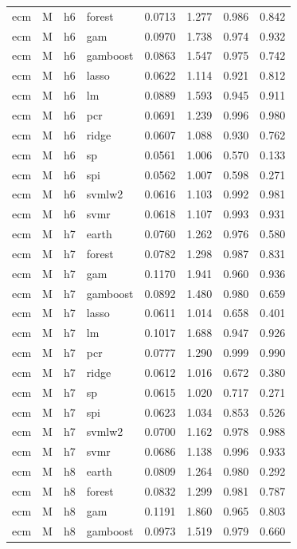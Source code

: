 \begin{ThreePartTable}
\begin{longtable}[t]{llclcccc}
ecm & M & h6 & forest & 0.0713 & 1.277 & 0.986 & 0.842\\
ecm & M & h6 & gam & 0.0970 & 1.738 & 0.974 & 0.932\\
ecm & M & h6 & gamboost & 0.0863 & 1.547 & 0.975 & 0.742\\
ecm & M & h6 & lasso & 0.0622 & 1.114 & 0.921 & 0.812\\
ecm & M & h6 & lm & 0.0889 & 1.593 & 0.945 & 0.911\\
ecm & M & h6 & pcr & 0.0691 & 1.239 & 0.996 & 0.980\\
ecm & M & h6 & ridge & 0.0607 & 1.088 & 0.930 & 0.762\\
ecm & M & h6 & sp & 0.0561 & 1.006 & 0.570 & 0.133\\
ecm & M & h6 & spi & 0.0562 & 1.007 & 0.598 & 0.271\\
ecm & M & h6 & svmlw2 & 0.0616 & 1.103 & 0.992 & 0.981\\
ecm & M & h6 & svmr & 0.0618 & 1.107 & 0.993 & 0.931\\
\addlinespace
ecm & M & h7 & earth & 0.0760 & 1.262 & 0.976 & 0.580\\
ecm & M & h7 & forest & 0.0782 & 1.298 & 0.987 & 0.831\\
ecm & M & h7 & gam & 0.1170 & 1.941 & 0.960 & 0.936\\
ecm & M & h7 & gamboost & 0.0892 & 1.480 & 0.980 & 0.659\\
ecm & M & h7 & lasso & 0.0611 & 1.014 & 0.658 & 0.401\\
ecm & M & h7 & lm & 0.1017 & 1.688 & 0.947 & 0.926\\
ecm & M & h7 & pcr & 0.0777 & 1.290 & 0.999 & 0.990\\
ecm & M & h7 & ridge & 0.0612 & 1.016 & 0.672 & 0.380\\
ecm & M & h7 & sp & 0.0615 & 1.020 & 0.717 & 0.271\\
ecm & M & h7 & spi & 0.0623 & 1.034 & 0.853 & 0.526\\
ecm & M & h7 & svmlw2 & 0.0700 & 1.162 & 0.978 & 0.988\\
ecm & M & h7 & svmr & 0.0686 & 1.138 & 0.996 & 0.933\\
\addlinespace
ecm & M & h8 & earth & 0.0809 & 1.264 & 0.980 & 0.292\\
ecm & M & h8 & forest & 0.0832 & 1.299 & 0.981 & 0.787\\
ecm & M & h8 & gam & 0.1191 & 1.860 & 0.965 & 0.803\\
ecm & M & h8 & gamboost & 0.0973 & 1.519 & 0.979 & 0.660\\

\end{longtable}
\end{ThreePartTable}
